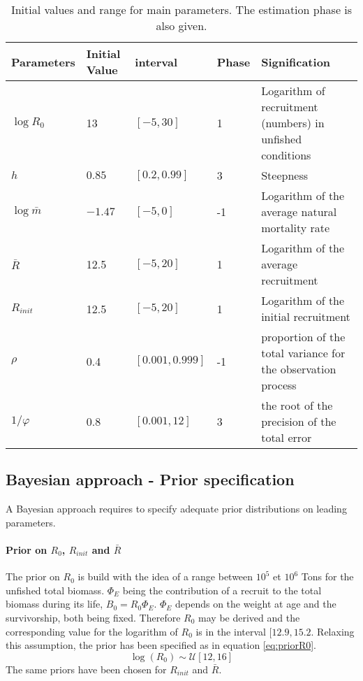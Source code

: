 \begin{table}[ht]
\centering
\begin{tabular}{p{2.1cm}p{2.1cm}p{2.2cm}p{2cm}p{6cm}}
  \hline
Parameters & Initial Value & interval & Phase & Signification  \\ \hline
 $\log{R_0}$ & 13  & $[-5,30]$ & 1 & Logarithm of recruitment (numbers) in unfished conditions\\
 $h$ & $0.85$ & $[0.2, 0.99]$ & 3 &  Steepness \\
$\log{\bar{m}}$ & $-1.47$ & $[-5,0]$ &-1 & Logarithm of the average natural mortality rate\\
$\bar{R}$& 12.5	& $[-5,	20]$ &	1	 & Logarithm of the average recruitment\\
$R_{init}$ & 12.5&	$[-5,	20]$ &	1	 & Logarithm of the initial recruitment\\
$\rho$ & 0.4	& $[0.001,0.999]$ & -1 & proportion of the total variance for the observation process \\
$1/\varphi$ & 0.8 &	$[0.001,	12]$ & 	3 & the root of the precision of the total error \\
\hline
\end{tabular}
\caption{Initial values and range for main parameters. The estimation phase is also given.}
\label{table:initial}
\end{table}


\subsection{Bayesian approach - Prior specification}
A Bayesian approach requires to specify adequate prior distributions on leading parameters.
\paragraph{Prior on $R_0$, $R_{init}$ and $\bar{R}$}
The prior on $R_0$ is build with the idea of a range between $10^5$ et $10^6$ Tons for the unfished total biomass. $\Phi_E$ being the contribution of a recruit to the total biomass during its life, 
$B_0=R_0\Phi_E$. $\Phi_E$ depends on the weight at age and the survivorship, both being fixed. Therefore $R_0$ may be derived and the corresponding value for the logarithm of $R_0$ is in the interval $[12.9, 15.2$. Relaxing this assumption, 
the prior has been specified as in equation \ref{eq:priorR0}.
\begin{equation}
\log(R_0) \sim \mathcal{U}[12, 16] 
\label{eq:priorR0}
\end{equation}
The same priors have been chosen for $R_{init}$ and $\bar{R}$. 


